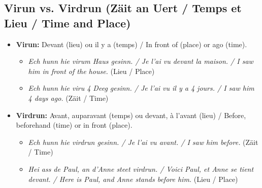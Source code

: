 \subsection*{Virun vs. Virdrun (Zäit an Uert / Temps et Lieu / Time and Place)}
\begin{itemize}
    \item \textbf{Virun:} Devant (lieu) ou il y a (temps) / In front of (place) or ago (time). 
        \begin{itemize}
            \item \textit{Ech hunn hie virum Haus gesinn. / Je l'ai vu devant la maison. / I saw him in front of the house.} (Lieu / Place)
            \item \textit{Ech hunn hie viru 4 Deeg gesinn. / Je l'ai vu il y a 4 jours. / I saw him 4 days ago.} (Zäit / Time)
        \end{itemize}
    \item \textbf{Virdrun:} Avant, auparavant (temps) ou devant, à l'avant (lieu) / Before, beforehand (time) or in front (place). 
        \begin{itemize}
            \item \textit{Ech hunn hie virdrun gesinn. / Je l'ai vu avant. / I saw him before.} (Zäit / Time)
            \item \textit{Hei ass de Paul, an d'Anne steet virdrun. / Voici Paul, et Anne se tient devant. / Here is Paul, and Anne stands before him.} (Lieu / Place)
        \end{itemize}
\end{itemize}

